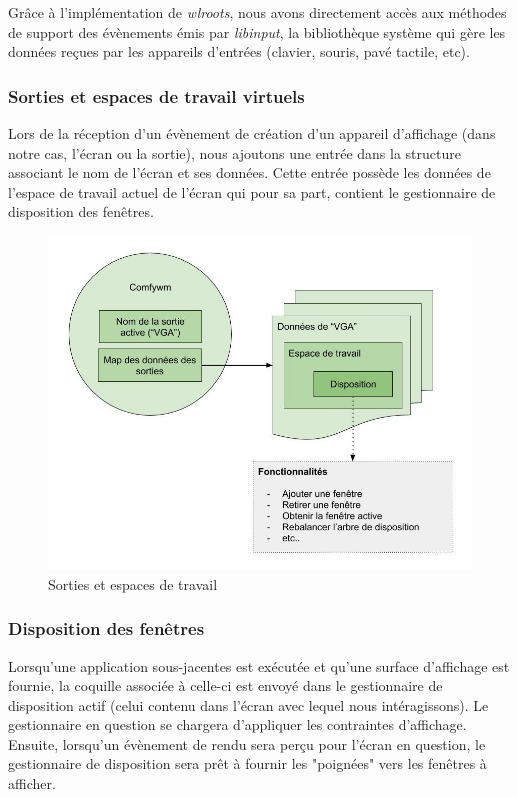 \documentclass[titlepage]{article}
\begin{document}
\par
Grâce à l'implémentation de \textit{wlroots}, nous avons directement accès aux méthodes de support des évènements émis par \textit{libinput}, la bibliothèque système qui gère les données reçues par les appareils d'entrées (clavier, souris, pavé tactile, etc).
\bigskip

\subsubsection{Sorties et espaces de travail virtuels}
\par
Lors de la réception d'un évènement de création d'un appareil d'affichage (dans notre cas, l'écran ou la sortie), nous ajoutons une entrée dans la structure associant le nom de l'écran et ses données. Cette entrée possède les données de l'espace de travail actuel de l'écran qui pour sa part, contient le gestionnaire de disposition des fenêtres.
\bigskip

\begin{figure}[H]
	\centering
	\includegraphics[width=\textwidth]{sorties_et_espaces_de_travail.jpg}
	\caption{Sorties et espaces de travail}
\end{figure}

\subsubsection{Disposition des fenêtres}
\par
Lorsqu'une application sous-jacentes est exécutée et qu'une surface d'affichage est fournie, la coquille associée à celle-ci est envoyé dans le gestionnaire de disposition actif (celui contenu dans l'écran avec lequel nous intéragissons). Le gestionnaire en question se chargera d'appliquer les contraintes d'affichage. Ensuite, lorsqu'un évènement de rendu sera perçu pour l'écran en question, le gestionnaire de disposition sera prêt à fournir les "poignées" vers les fenêtres à afficher.
\bigskip
\end{document}
